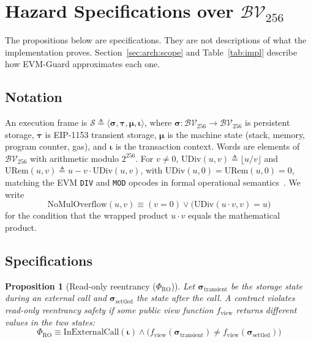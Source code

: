 \documentclass[pdflatex,sn-mathphys]{sn-jnl}
\theoremstyle{thmstyleone}
\newtheorem{proposition}{Proposition}
\theoremstyle{thmstyletwo}
\begin{document}
\section{Hazard Specifications over \texorpdfstring{$\mathcal{BV}_{256}$}{BV256}}\label{sec:formal_framework}

The propositions below are specifications. They are not descriptions of what the implementation proves. Section~\ref{sec:arch:scope} and Table~\ref{tab:impl} describe how EVM-Guard approximates each one.

\subsection{Notation}\label{sec:math:state}
An execution frame is $\mathcal{S} \triangleq \langle \mathbf{\sigma}, \mathbf{\tau}, \mathbf{\mu}, \mathbf{\iota} \rangle$, where $\mathbf{\sigma}: \mathcal{BV}_{256} \to \mathcal{BV}_{256}$ is persistent storage, $\mathbf{\tau}$ is EIP-1153 transient storage, $\mathbf{\mu}$ is the machine state (stack, memory, program counter, gas), and $\mathbf{\iota}$ is the transaction context. Words are elements of $\mathcal{BV}_{256}$ with arithmetic modulo $2^{256}$. For $v \neq 0$, $\mathrm{UDiv}(u, v) \triangleq \lfloor u / v \rfloor$ and $\mathrm{URem}(u, v) \triangleq u - v \cdot \mathrm{UDiv}(u, v)$, with $\mathrm{UDiv}(u, 0) = \mathrm{URem}(u, 0) = 0$, matching the EVM \texttt{DIV} and \texttt{MOD} opcodes in formal operational semantics~\cite{wood2014ethereum,grishchenko2018semantic,hildenbrandt2018kevm}. We write
\begin{equation}
    \mathrm{NoMulOverflow}(u, v) \equiv (v = 0) \lor \big(\mathrm{UDiv}(u \cdot v, v) = u\big)
\end{equation}
for the condition that the wrapped product $u \cdot v$ equals the mathematical product.

\subsection{Specifications}\label{sec:math:invariants}

\begin{proposition}[Read-only reentrancy ($\Phi_{\mathrm{RO}}$)]\label{prop:ro}
Let $\mathbf{\sigma}_{\mathrm{transient}}$ be the storage state during an external call and $\mathbf{\sigma}_{\mathrm{settled}}$ the state after the call. A contract violates read-only reentrancy safety if some public view function $f_{\mathrm{view}}$ returns different values in the two states:
\begin{equation}
    \Phi_{\mathrm{RO}} \equiv \mathrm{InExternalCall}(\mathbf{\iota}) \land \Big( f_{\mathrm{view}}(\mathbf{\sigma}_{\mathrm{transient}}) \neq f_{\mathrm{view}}(\mathbf{\sigma}_{\mathrm{settled}}) \Big)
\end{equation}
\end{proposition}
\end{document}
